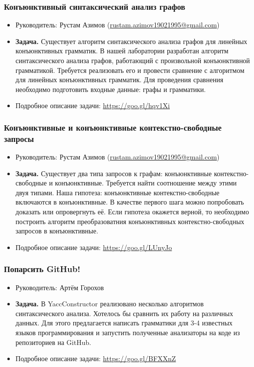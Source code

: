 \documentclass{beamer}
\begin{document}
\begin{frame}
  \transwipe[direction=90]
  \frametitle{Конъюнктивный синтаксический анализ графов}
  \begin{itemize}
    \item Руководитель: Рустам Азимов (\url{rustam.azimov19021995@gmail.com})
    \item \textbf{Задача.} 
    Существует алгоритм синтаксического анализа графов для линейных конъюнктивных грамматик. 
    В нашей лаборатории разработан алгоритм синтаксического анализа графов, работающий с произвольной конъюнктивной грамматикой.
    Требуется реализовать его и провести сравнение с алгоритмом для линейных конъюнктивных грамматик. 
    Для проведения сравнения необходимо подготовить входные данные: графы и грамматики.
    \item Подробное описание задачи: \url{https://goo.gl/hqv1Xi}
  \end{itemize}
\end{frame}

\begin{frame}
  \transwipe[direction=90]
  \frametitle{Конъюнктивные и конъюнктивные контекстно-свободные запросы}
  \begin{itemize}
    \item Руководитель: Рустам Азимов (\url{rustam.azimov19021995@gmail.com})
    \item \textbf{Задача.} 
    Существует два типа запросов к графам: конъюнктивные контекстно-свободные и конъюнктивные. 
    Требуется найти соотношение между этими двуя типами.
    Наша гипотеза: конъюнктивные контекстно-свободные включаются в конъюнктивные.
    В качестве первого шага можно попробовать доказать или опровергнуть её. 
    Если гипотеза окажется верной, то необходимо построить алгоритм преобразоватния конъюнктивных контекстно-свободных запросов в конъюнктивные.
    \item Подробное описание задачи: \url{https://goo.gl/LUnyJo}
  \end{itemize}
\end{frame}


\begin{frame}
  \transwipe[direction=90]
  \frametitle{Попарсить GitHub!}
  \begin{itemize}
    \item Руководитель: Артём Горохов
    \item \textbf{Задача.}
    В YaccConstructor реализовано несколько алгоритмов синтаксического анализа.
    Хотелось бы сравнить их работу на различных данных.
    Для этого предлагается написать грамматики для 3-4 известных языков программирования и запустить полученные анализаторы на коде из репозиториев на GitHub.
    \item Подробное описание задачи: \url{https://goo.gl/BFXXnZ}
  \end{itemize}

\end{frame}
\end{document}
